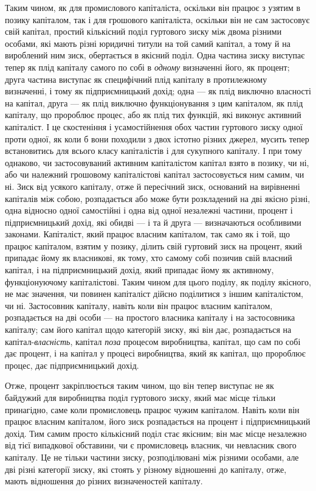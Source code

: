 Таким чином, як для промислового капіталіста, оскільки він
працює з узятим в позику капіталом, так і для грошового капіталіста,
оскільки він не сам застосовує свій капітал, простий
кількісний поділ гуртового зиску між двома різними особами,
які мають різні юридичні титули на той самий капітал, а тому
й на вироблений ним зиск, обертається в якісний поділ. Одна
частина зиску виступає тепер як плід капіталу самого по собі
в \emph{одному} визначенні його, як процент; друга частина виступає
як специфічний плід капіталу в протилежному визначенні, і
тому як підприємницький дохід; одна — як плід виключно власності
на капітал, друга — як плід виключно функціонування
з цим капіталом, як плід капіталу, що пророблює процес,
або як плід тих функцій, які виконує активний капіталіст. І це
скостеніння і усамостійнення обох частин гуртового зиску одної
проти одної, як коли б вони походили з двох істотно різних
джерел, мусить тепер встановитись для всього класу капіталістів
і для сукупного капіталу. І при тому однаково, чи застосовуваний
активним капіталістом капітал взято в позику, чи ні, або
чи належний грошовому капіталістові капітал застосовується
ним самим, чи ні. Зиск від усякого капіталу, отже й пересічний
зиск, оснований на вирівненні капіталів між собою, розпадається
або може бути розкладений на дві якісно різні, одна відносно
одної самостійні і одна від одної незалежні частини, процент
і підприємницький дохід, які обидві — і та й друга — визначаються
особливими законами. Капіталіст, який працює власним
капіталом, так само як і той, що працює капіталом,
взятим у позику, ділить свій гуртовий зиск на процент, який
припадає йому як власникові, як тому, хто самому собі позичив
свій власний капітал, і на підприємницький дохід, який припадає
йому як активному, функціонуючому капіталістові. Таким чином
для цього поділу, як поділу якісного, не має значення, чи повинен
капіталіст дійсно поділитися з іншим капіталістом, чи ні.
Застосовник капіталу, навіть коли він працює власним капіталом,
розпадається на дві особи — на простого власника капіталу
і на застосовника капіталу; сам його капітал щодо категорій
зиску, які він дає, розпадається на капітал-\emph{власність}, капітал
\emph{поза} процесом виробництва, капітал, що сам по собі дає процент,
і на капітал у процесі виробництва, який як капітал, що
пророблює процес, дає підприємницький дохід.

Отже, процент закріплюється таким чином, що він тепер виступає
не як байдужий для виробництва поділ гуртового зиску,
який має місце тільки принагідно, саме коли промисловець працює
чужим капіталом. Навіть коли він працює власним капіталом,
його зиск розпадається на процент і підприємницький
дохід. Тим самим просто кількісний поділ стає якісним; він має
місце незалежно від тієї випадкової обставини, чи є промисловець
власник, чи невласник свого капіталу. Це не тільки частини
зиску, розподілювані між різними особами, але дві різні
категорії зиску, які стоять у різному відношенні до капіталу,
отже, мають відношення до різних визначеностей капіталу.
